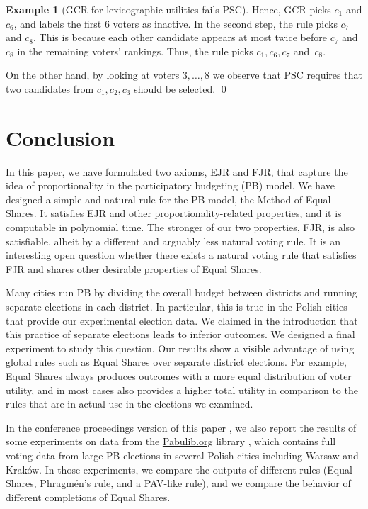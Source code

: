 \documentclass[10pt]{scrartcl}
\theoremstyle{definition}
\newtheorem{example}{Example}
\theoremstyle{plain}
\begin{document}
\begin{example}[GCR for lexicographic utilities fails PSC]
	Hence, GCR picks $c_1$ and $c_6$, and labels the first 6 voters as inactive. In the second step, the rule picks $c_7$ and $c_8$. This is because each other candidate appears at most twice before $c_7$ and $c_8$ in the remaining voters' rankings. Thus, the rule picks $c_1, c_6, c_7$ and~$c_8$.
	
	On the other hand, by looking at voters $3, \ldots, 8$ we observe that PSC requires that two candidates from $c_1, c_2, c_3$ should be selected.
	\qed
\end{example}



\section{Conclusion}

In this paper, we have formulated two axioms, EJR and FJR, that capture the idea of proportionality in the participatory budgeting (PB) model. We have designed a simple and natural rule for the PB model, the Method of Equal Shares. It satisfies EJR and other proportionality-related properties, and it is computable in polynomial time. The stronger of our two properties, FJR, is also satisfiable, albeit by a different and arguably less natural voting rule. It is an interesting open question whether there exists a natural voting rule that satisfies FJR and shares other desirable properties of Equal Shares.  

Many cities run PB by dividing the overall budget between districts and running separate elections in each district. In particular, this is true in the Polish cities that provide our experimental election data. We claimed in the introduction that this practice of separate elections leads to inferior outcomes. We designed a final experiment to study this question. Our results show a visible advantage of using global rules such as Equal Shares over separate district elections. For example, Equal Shares always produces outcomes with a more equal distribution of voter utility, and in most cases also provides a higher total utility in comparison to the rules that are in actual use in the elections we examined. 

In the conference proceedings version of this paper \citep[\href{https://proceedings.neurips.cc/paper/2021/hash/69f8ea31de0c00502b2ae571fbab1f95-Abstract.html}{link to online version}]{peters2021neurips}, we also report the results of some experiments on data from the \href{http://pabulib.org/}{Pabulib.org} library \citep{stolicki2020pabulib}, which contains full voting data from large PB elections in several Polish cities including Warsaw and Krak\'ow. In those experiments, we compare the outputs of different rules (Equal Shares, Phragm\'en's rule, and a PAV-like rule), and we compare the behavior of different completions of Equal Shares.
\end{document}
